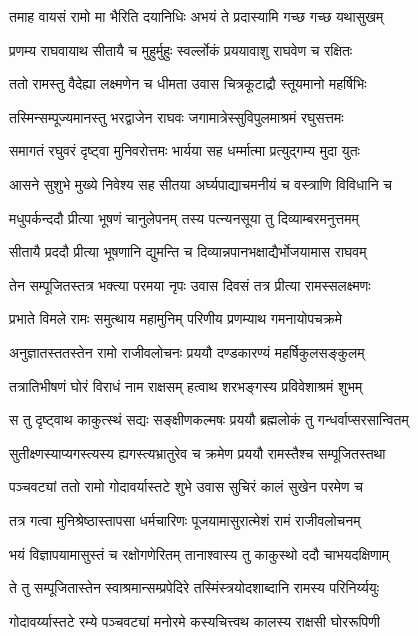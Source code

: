 \twolineshloka
{तमाह वायसं रामो मा भैरिति दयानिधिः}
{अभयं ते प्रदास्यामि गच्छ गच्छ यथासुखम्}%

\twolineshloka
{प्रणम्य राघवायाथ सीतायै च मुहुर्मुहुः}
{स्वर्ल्लोकं प्रययावाशु राघवेण च रक्षितः}%

\twolineshloka
{ततो रामस्तु वैदेह्या लक्ष्मणेन च धीमता}
{उवास चित्रकूटाद्रौ स्तूयमानो महर्षिभिः}%

\twolineshloka
{तस्मिन्सम्पूज्यमानस्तु भरद्वाजेन राघवः}
{जगामात्रेस्सुविपुलमाश्रमं रघुसत्तमः}%

\twolineshloka
{समागतं रघुवरं दृष्ट्वा मुनिवरोत्तमः}
{भार्यया सह धर्म्मात्मा प्रत्युद्गम्य मुदा युतः}%

\twolineshloka
{आसने सुशुभे मुख्ये निवेश्य सह सीतया}
{अर्घ्यपाद्याचमनीयं च वस्त्राणि विविधानि च}%

\twolineshloka
{मधुपर्कन्ददौ प्रीत्या भूषणं चानुलेपनम्}
{तस्य पत्न्यनसूया तु दिव्याम्बरमनुत्तमम्}%

\twolineshloka
{सीतायै प्रददौ प्रीत्या भूषणानि द्युमन्ति च}
{दिव्यान्नपानभक्षाद्यैर्भोजयामास राघवम्}%

\twolineshloka
{तेन सम्पूजितस्तत्र भक्त्या परमया नृपः}
{उवास दिवसं तत्र प्रीत्या रामस्सलक्ष्मणः}%

\twolineshloka
{प्रभाते विमले रामः समुत्थाय महामुनिम्}
{परिणीय प्रणम्याथ गमनायोपचक्रमे}%

\twolineshloka
{अनुज्ञातस्ततस्तेन रामो राजीवलोचनः}
{प्रययौ दण्डकारण्यं महर्षिकुलसङ्कुलम्}%

\twolineshloka
{तत्रातिभीषणं घोरं विराधं नाम राक्षसम्}
{हत्वाथ शरभङ्गस्य प्रविवेशाश्रमं शुभम्}%

\twolineshloka
{स तु दृष्ट्वाथ काकुत्स्थं सद्यः सङ्क्षीणकल्मषः}
{प्रययौ ब्रह्मलोकं तु गन्धर्वाप्सरसान्वितम्}%

\twolineshloka
{सुतीक्ष्णस्याप्यगस्त्यस्य ह्यगस्त्यभ्रातुरेव च}
{क्रमेण प्रययौ रामस्तैश्च सम्पूजितस्तथा}%

\twolineshloka
{पञ्चवट्यां ततो रामो गोदावर्यास्तटे शुभे}
{उवास सुचिरं कालं सुखेन परमेण च}%

\twolineshloka
{तत्र गत्वा मुनिश्रेष्ठास्तापसा धर्मचारिणः}
{पूजयामासुरात्मेशं रामं राजीवलोचनम्}%

\twolineshloka
{भयं विज्ञापयामासुस्तं च रक्षोगणेरितम्}
{तानाश्वास्य तु काकुस्थो ददौ चाभयदक्षिणाम्}%

\twolineshloka
{ते तु सम्पूजितास्तेन स्वाश्रमान्सम्प्रपेदिरे}
{तस्मिंस्त्रयोदशाब्दानि रामस्य परिनिर्य्ययुः}%

\twolineshloka
{गोदावर्य्यास्तटे रम्ये पञ्चवट्यां मनोरमे}
{कस्यचित्त्वथ कालस्य राक्षसी घोररूपिणी}%

